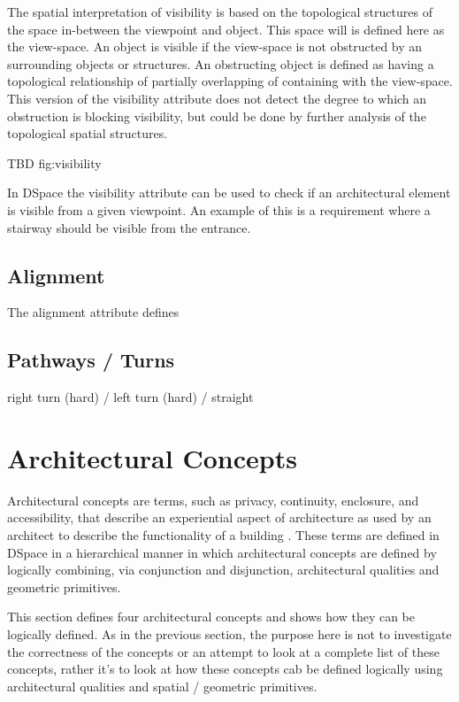 \documentclass[12pt]{ucthesis}
\begin{document}
The spatial interpretation of visibility is based on the topological structures of the space in-between the viewpoint and object. This space will is defined here as the view-space. An object is visible if the view-space is not obstructed by an surrounding objects or structures. An obstructing object is defined as having a topological relationship of partially overlapping of containing with the view-space. This version of the visibility attribute does not detect the degree to which an obstruction is blocking visibility, but could be done by further analysis of the topological spatial structures.

TBD fig:visibility

In DSpace the visibility attribute can be used to check if an architectural element is visible from a given viewpoint. An example of this is a requirement where a stairway should be visible from the entrance.


\subsection{Alignment}
The alignment attribute defines 

\subsection{Pathways / Turns}  right turn (hard) / left turn (hard) / straight 


\section{Architectural Concepts}
Architectural concepts are terms, such as privacy, continuity, enclosure, and accessibility, that describe an experiential aspect of architecture as used by an architect to describe the functionality of a building \cite{Koile}. These terms are defined in DSpace in a hierarchical manner in which architectural concepts are defined by logically combining, via conjunction and disjunction, architectural qualities and geometric primitives. 

This section defines four architectural concepts and shows how they can be logically defined. As in the previous section, the purpose here is not to investigate the correctness of the concepts or an attempt to look at a complete list of these concepts, rather it's to look at how these concepts cab be defined logically using architectural qualities and spatial / geometric primitives.
\end{document}
